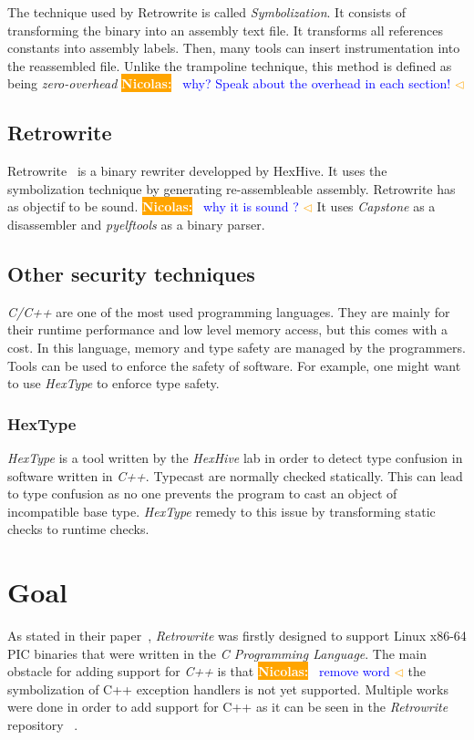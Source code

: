 \documentclass[a4paper,11pt,oneside]{report}
\newcommand{\sysname}{Retrowrite\xspace}
\newcommand{\todobox}[3]{%
    \colorbox{#1}{\textcolor{white}{\sffamily\bfseries\scriptsize #2}}%
    ~\textcolor{blue}{#3} %
    \textcolor{#1}{$\triangleleft$}%
}
\newcommand{\nb}[1]{\todobox{orange}{Nicolas:}{#1}}
\begin{document}
The technique used by \sysname is called \textit{Symbolization}. It
consists of transforming the binary into an assembly text file. It transforms
all references constants into assembly labels. Then, many tools can insert
instrumentation into the reassembled file. Unlike the trampoline technique,
this method is defined as being \textit{zero-overhead} \nb{why? Speak about the
overhead in each section!}

\section{Retrowrite}
Retrowrite~\cite{dinesh20oakland} is a binary rewriter developped by HexHive.
It uses the symbolization technique by generating re-assembleable assembly.
Retrowrite has as objectif to be sound. \nb{why it is sound ?} It uses
\textit{Capstone} as a disassembler and \textit{pyelftools} as a binary parser.

\section{Other security techniques}
\textit{C/C++} are one of the most used programming languages. They are
mainly for their runtime performance and low level memory access, but this
comes with a cost. In this language, memory and type safety are managed by the
programmers. Tools can be used to enforce the safety of software. For example,
one might want to use \textit{HexType} to enforce type safety.
\subsection{HexType}
\textit{HexType} is a tool written by the \textit{HexHive} lab in order to
detect type confusion in software written in \textit{C++}. Typecast are
normally checked statically. This can lead to type confusion as no one prevents
the program to cast an object of incompatible base type. \textit{HexType}
remedy to this issue by transforming static checks to runtime checks.


\chapter{Goal}
As stated in their paper~\cite{dinesh20oakland}, \textit{Retrowrite} was
firstly designed to support Linux x86-64 PIC binaries that were written in the
\textit{C Programming Language}. The main obstacle for adding support for
\textit{C++} is that \nb{remove word}the symbolization of C++ exception
handlers is not yet supported. Multiple works were done in order to add support
for C++ as it can be seen in the \textit{Retrowrite} repository
~\cite{gitCommit}.
\end{document}
